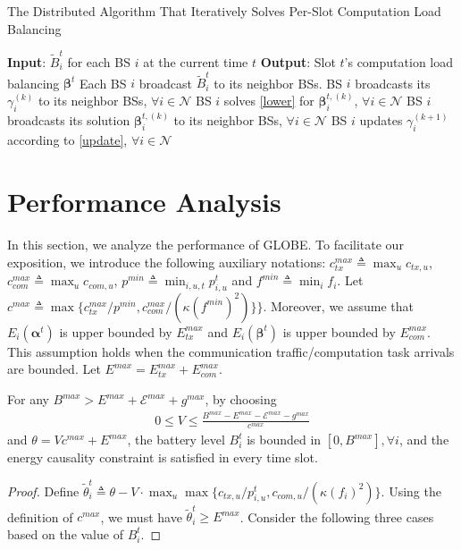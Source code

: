 \documentclass[12pt, draftclsnofoot, letterpaper, onecolumn]{IEEEtran}
\begin{document}
{\begin{algorithm}[htb]
	\caption{The Distributed Algorithm That Iteratively Solves Per-Slot Computation Load Balancing}
	\begin{algorithmic}[1]
		\State \textbf{Input}: $\tilde{B}^t_i$ for each BS $i$ at the current time $t$
		\State \textbf{Output}: Slot $t$'s computation load balancing $\bm\beta^t$
        \State Each BS $i$ broadcast $\tilde{B}^t_i$ to its neighbor BSs.
            \State  BS $i$ broadcasts its $\gamma^{(k)}_i$ to its neighbor BSs, $\forall i \in \mathcal{N}$
            \State  BS $i$ solves \eqref{lower} for $\bm\beta^{t, (k)}_i$, $\forall i \in \mathcal{N}$
            \State  BS $i$ broadcasts its solution $\bm\beta^{t, (k)}_i$ to its neighbor BSs, $\forall i \in \mathcal{N}$
            \State  BS $i$ updates $\gamma^{(k+1)}_i$ according to \eqref{update}, $\forall i \in \mathcal{N}$
		\EndFor
	\end{algorithmic}
\end{algorithm}



\section{Performance Analysis}
In this section, we analyze the performance of GLOBE. To facilitate our exposition, we introduce the following auxiliary notations: $c^{max}_{tx} \triangleq \max_u c_{tx, u}$, $c^{max}_{com} \triangleq \max_u c_{com, u}$, $p^{min} \triangleq \min_{i,u,t} p^t_{i,u}$ and $f^{min} \triangleq \min_i f_i$. Let $c^{max} \triangleq \max\{c^{max}_{tx}/p^{min},c^{max}_{com}/(\kappa (f^{min})^2)\}\}$. Moreover, we assume that $E_i(\bm\alpha^t)$ is upper bounded by $E^{max}_{tx}$ and $E_i(\bm\beta^t)$ is upper bounded by $E^{max}_{com}$. This assumption holds when the communication traffic/computation task arrivals are bounded. Let $E^{max} = E^{max}_{tx} + E^{max}_{com}$.

\begin{lemma} \label{lemma:perturbation}
For any $B^{max} > E^{max} + \mathcal{E}^{max} + g^{max}$, by choosing
\begin{align}
0\leq V \leq \frac{B^{max} - E^{max} - \mathcal{E}^{max} - g^{max}}{c^{max}}
\end{align}
and $\theta = V c^{max} + E^{max}$, the battery level $B^t_i$ is bounded in $[0, B^{max}], \forall i$, and the energy causality constraint is satisfied in every time slot.
\end{lemma}
\begin{proof}
Define $\tilde{\theta}^t_i \triangleq \theta - V\cdot\max_u\max\{c_{tx,u}/p^t_{i,u}, c_{com,u}/(\kappa(f_i)^2)\}$. Using the definition of $c^{max}$, we must have $\tilde{\theta}^t_i  \geq E^{max}$. Consider the following three cases based on the value of $B^t_i$.


\end{proof}}
\end{document}
